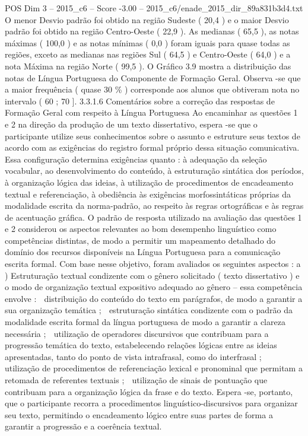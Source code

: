\begin{textsample}{POS Dim 3 – 2015\_c6 – Score -3.00 – 2015\_c6/enade\_2015\_dir\_89a831b3d4.txt}
O menor Desvio padrão foi obtido na região Sudeste ( 20,4 ) e o maior Desvio padrão foi obtido na região Centro-Oeste ( 22,9 ).
As medianas ( 65,5 ), as notas máximas ( 100,0 ) e as notas mínimas ( 0,0 ) foram iguais para quase todas as regiões, exceto as medianas nas regiões Sul ( 64,5 ) e Centro-Oeste ( 64,0 ) e a nota Máxima na região Norte ( 99,5 ).
O Gráfico 3.9 mostra a distribuição das notas de Língua Portuguesa do Componente de Formação Geral.
Observa -se que a maior frequência ( quase 30 \% ) corresponde aos alunos que obtiveram nota no intervalo ( 60 ; 70 ]. 3.3.1.6 Comentários sobre a correção das respostas de Formação Geral com respeito à Língua Portuguesa Ao encaminhar as questões 1 e 2 na direção da produção de um texto dissertativo, espera -se que o participante utilize seus conhecimentos sobre o assunto e estruture seus textos de acordo com as exigências do registro formal próprio dessa situação comunicativa.
Essa configuração determina exigências quanto : à adequação da seleção vocabular, ao desenvolvimento do conteúdo, à estruturação sintática dos períodos, à organização lógica das ideias, à utilização de procedimentos de encadeamento textual e referenciação, à obediência às exigências morfossintáticas próprias da modalidade escrita da norma-padrão, ao respeito às regras ortográficas e às regras de acentuação gráfica.
O padrão de resposta utilizado na avaliação das questões 1 e 2 considerou os aspectos relevantes ao bom desempenho linguístico como competências distintas, de modo a permitir um mapeamento detalhado do domínio dos recursos disponíveis na Língua Portuguesa para a comunicação escrita formal.
Com base nesse objetivo, foram avaliados os seguintes aspectos : a ) Estruturação textual condizente com o gênero solicitado ( texto dissertativo ) e o modo de organização textual expositivo adequado ao gênero – essa competência envolve :  distribuição do conteúdo do texto em parágrafos, de modo a garantir a sua organização temática ;  estruturação sintática condizente com o padrão da modalidade escrita formal da língua portuguesa de modo a garantir a clareza necessária ;  utilização de operadores discursivos que contribuam para a progressão temática do texto, estabelecendo relações lógicas entre as ideias apresentadas, tanto do ponto de vista intrafrasal, como do interfrasal ;  utilização de procedimentos de referenciação lexical e pronominal que permitam a retomada de referentes textuais ;  utilização de sinais de pontuação que contribuam para a organização lógica da frase e do texto.
Espera -se, portanto, que o participante recorra a procedimentos linguístico-discursivos para organizar seu texto, permitindo o encadeamento lógico entre suas partes de forma a garantir a progressão e a coerência textual.

\end{textsample}
